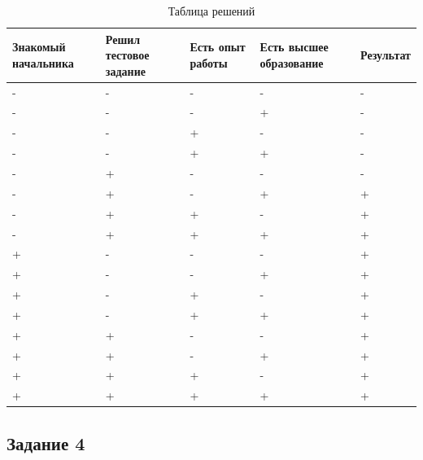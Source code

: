 \documentclass[14pt,a4paper,report]{report}
\begin{document}
\begin{table}[h!]
	\centering
	\bgroup
	\def\arraystretch{1}
	\begin{tabular}{ | P{1.8cm} | P{1.8cm} | P{1.8cm} | P{1.8cm} | P{1.8cm} | }
		\hline
		Знакомый начальника & Решил тестовое задание & Есть опыт работы & Есть высшее образование & Результат 
		\\ \hline
		
		- & - & - & - & - \\ \hline
		
		- & - & - & + & - \\ \hline
		
		- & - & + & - & - \\ \hline
		
		- & - & + & + & - \\ \hline
		
		- & + & - & - & - \\ \hline
		
		- & + & - & + & + \\ \hline
		
		- & + & + & - & + \\ \hline
		
		- & + & + & + & + \\ \hline
		
		+ & - & - & - & + \\ \hline
		
		+ & - & - & + & + \\ \hline
		
		+ & - & + & - & + \\ \hline
		
		+ & - & + & + & + \\ \hline
		
		+ & + & - & - & + \\ \hline
		
		+ & + & - & + & + \\ \hline
		
		+ & + & + & - & + \\ \hline
		
		+ & + & + & + & + \\ \hline
		
	\end{tabular}
	\egroup
	\caption{Таблица решений}
	\label{table:1}
\end{table}

\subsection{Задание 4}
\end{document}
